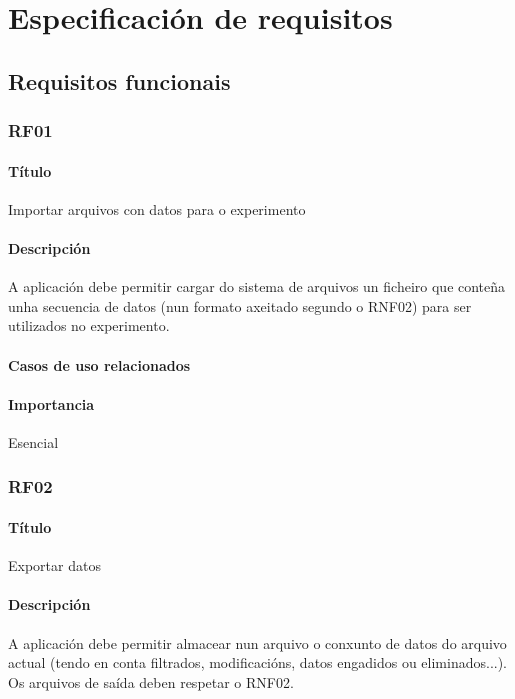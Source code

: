 \chapter{Especificación de requisitos}

\section{Requisitos funcionais}

\subsection*{RF01}

\subsubsection{Título}
Importar arquivos con datos para o experimento

\subsubsection{Descripción}
A aplicación debe permitir cargar do sistema de arquivos un ficheiro que conteña unha secuencia de datos (nun formato axeitado segundo o RNF02) para ser utilizados no experimento.

\subsubsection{Casos de uso relacionados}

\subsubsection{Importancia}
Esencial

\subsection*{RF02}
\subsubsection{Título}
Exportar datos
\subsubsection{Descripción}
A aplicación debe permitir almacear nun arquivo o conxunto de datos do arquivo actual (tendo en conta filtrados, modificacións, datos engadidos ou eliminados...). Os arquivos de saída deben respetar o RNF02.
